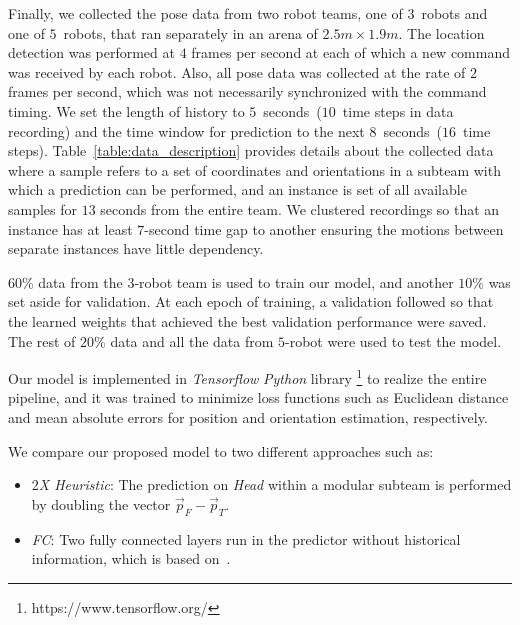 \documentclass[letterpaper, 10 pt, conference]{ieeeconf}  %
\begin{document}
	Finally, we collected the pose data from two robot teams, one of $3$~robots and one
	of $5$~robots, that ran separately in an arena of $2.5 m \times 1.9 m$.
	The location detection was performed at $4$ frames per second at each of
	which a new command was received by each robot. Also, all pose data was
	collected at the rate of $2$ frames per second,
	which was not necessarily synchronized with the command timing.
	We set the length of history to $5$~seconds~($10$~time steps in data recording) and
	the time window for prediction to the next $8$~seconds~($16$~time steps).
	Table~\ref{table:data_description} provides details about the collected data
	where a sample refers to a set of coordinates and orientations in a subteam
	with which a prediction can be performed, and an instance is set of all available samples for $13$ seconds from the entire team. We clustered recordings so that
	an instance has at least $7$-second time gap to another ensuring
	the motions between separate instances have little dependency.

	$60$\% data from the $3$-robot team is used to train our model, and another $10\%$
	was set aside for validation. At each epoch of training, a validation followed so that
	the learned weights that achieved the best validation performance were saved.
	The rest of $20\%$ data and all the data from $5$-robot were used to test the model.

	Our model is implemented in \emph{Tensorflow} \emph{Python} library \footnote{https://www.tensorflow.org/}
	to realize the entire pipeline, and it was trained to minimize
	loss functions such as Euclidean distance and mean absolute errors
	for position and orientation estimation, respectively.

	We compare our proposed model to two different approaches such as:
	\begin{itemize}
		\item \emph{$2$X Heuristic}:
		The prediction on \emph{Head} within a modular subteam is performed by doubling the vector
		$\vec{p}_{F} - \vec{p}_{T}$.

		\item \emph{FC}:
		Two fully connected layers run in the predictor without historical
		information, which is based on~\cite{CPR17}.

	\end{itemize}

\end{document}
